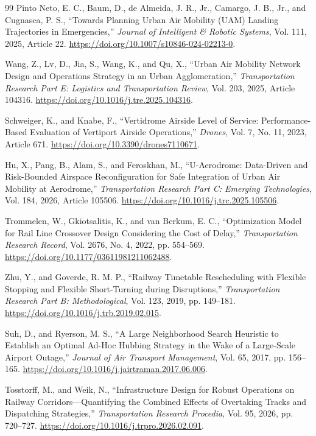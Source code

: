 \documentclass[11pt,letterpaper]{article}
\begin{document}
\begin{thebibliography}{99}
Pinto Neto, E. C., Baum, D., de Almeida, J. R., Jr., Camargo, J. B., Jr., and Cugnasca, P. S., ``Towards Planning Urban Air Mobility (UAM) Landing Trajectories in Emergencies,'' \emph{Journal of Intelligent \& Robotic Systems}, Vol. 111, 2025, Article 22. \url{https://doi.org/10.1007/s10846-024-02213-0}.

Wang, Z., Lv, D., Jia, S., Wang, K., and Qu, X., ``Urban Air Mobility Network Design and Operations Strategy in an Urban Agglomeration,'' \emph{Transportation Research Part E: Logistics and Transportation Review}, Vol. 203, 2025, Article 104316. \url{https://doi.org/10.1016/j.tre.2025.104316}.

Schweiger, K., and Knabe, F., ``Vertidrome Airside Level of Service: Performance-Based Evaluation of Vertiport Airside Operations,'' \emph{Drones}, Vol. 7, No. 11, 2023, Article 671. \url{https://doi.org/10.3390/drones7110671}.

Hu, X., Pang, B., Alam, S., and Feroskhan, M., ``U-Aerodrome: Data-Driven and Risk-Bounded Airspace Reconfiguration for Safe Integration of Urban Air Mobility at Aerodrome,'' \emph{Transportation Research Part C: Emerging Technologies}, Vol. 184, 2026, Article 105506. \url{https://doi.org/10.1016/j.trc.2025.105506}.

Trommelen, W., Gkiotsalitis, K., and van Berkum, E. C., ``Optimization Model for Rail Line Crossover Design Considering the Cost of Delay,'' \emph{Transportation Research Record}, Vol. 2676, No. 4, 2022, pp. 554--569. \url{https://doi.org/10.1177/03611981211062488}.

Zhu, Y., and Goverde, R. M. P., ``Railway Timetable Rescheduling with Flexible Stopping and Flexible Short-Turning during Disruptions,'' \emph{Transportation Research Part B: Methodological}, Vol. 123, 2019, pp. 149--181. \url{https://doi.org/10.1016/j.trb.2019.02.015}.

Suh, D., and Ryerson, M. S., ``A Large Neighborhood Search Heuristic to Establish an Optimal Ad-Hoc Hubbing Strategy in the Wake of a Large-Scale Airport Outage,'' \emph{Journal of Air Transport Management}, Vol. 65, 2017, pp. 156--165. \url{https://doi.org/10.1016/j.jairtraman.2017.06.006}.

Tosstorff, M., and Weik, N., ``Infrastructure Design for Robust Operations on Railway Corridors---Quantifying the Combined Effects of Overtaking Tracks and Dispatching Strategies,'' \emph{Transportation Research Procedia}, Vol. 95, 2026, pp. 720--727. \url{https://doi.org/10.1016/j.trpro.2026.02.091}.

\end{thebibliography}
\end{document}
